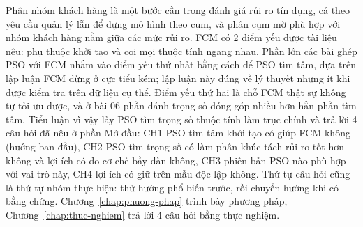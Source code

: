 Phân nhóm khách hàng là một bước cần trong đánh giá rủi ro tín dụng, cả theo yêu cầu quản lý lẫn để dựng mô hình theo cụm,
và phân cụm mờ phù hợp với nhóm khách hàng nằm giữa các mức rủi ro. FCM có 2 điểm yếu được tài liệu nêu: phụ thuộc khởi tạo
và coi mọi thuộc tính ngang nhau. Phần lớn các bài ghép PSO với FCM nhắm vào điểm yếu thứ nhất bằng cách để PSO tìm tâm, dựa
trên lập luận FCM dừng ở cực tiểu kém; lập luận này đúng về lý thuyết nhưng ít khi được kiểm tra trên dữ liệu cụ thể. Điểm
yếu thứ hai là chỗ FCM thật sự không tự tối ưu được, và ở bài 06 phần đánh trọng số đóng góp nhiều hơn hẳn phần tìm tâm.
Tiểu luận vì vậy lấy PSO tìm trọng số thuộc tính làm trục chính và trả lời 4 câu hỏi đã nêu ở phần Mở đầu: CH1 PSO tìm tâm
khởi tạo có giúp FCM không (hướng ban đầu), CH2 PSO tìm trọng số có làm phân khúc tách rủi ro tốt hơn không và lợi ích có do
cơ chế bầy đàn không, CH3 phiên bản PSO nào phù hợp với vai trò này, CH4 lợi ích có giữ trên mẫu độc lập không. Thứ tự
câu hỏi cũng là thứ tự nhóm thực hiện: thử hướng phổ biến trước, rồi chuyển hướng khi có bằng chứng.
Chương~\ref{chap:phuong-phap} trình bày phương pháp, Chương~\ref{chap:thuc-nghiem} trả lời 4 câu hỏi bằng thực nghiệm.
